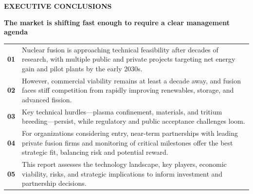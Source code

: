 \documentclass[10pt,a4paper]{article}
\begin{document}
{\textcolor{BOBlue}{\scriptsize\bfseries EXECUTIVE CONCLUSIONS}}\par\vspace{-1pt}
{\Large\sffamily\bfseries\color{BONavy} The market is shifting fast enough to require a clear management agenda}\par\vspace{4pt}
\vspace{2pt}{\color{BOBright}\rule{\linewidth}{1pt}}\vspace{5pt}
\begin{tabularx}{\linewidth}{p{13mm}Y}
\textcolor{BOBlue}{\bfseries 01} & {\small Nuclear fusion is approaching technical feasibility after decades of research, with multiple public and private projects targeting net energy gain and pilot plants by the early 2030s.} \\[6pt]
\textcolor{BOBlue}{\bfseries 02} & {\small However, commercial viability remains at least a decade away, and fusion faces stiff competition from rapidly improving renewables, storage, and advanced fission.} \\[6pt]
\textcolor{BOBlue}{\bfseries 03} & {\small Key technical hurdles—plasma confinement, materials, and tritium breeding—persist, while regulatory and public acceptance challenges loom.} \\[6pt]
\textcolor{BOBlue}{\bfseries 04} & {\small For organizations considering entry, near-term partnerships with leading private fusion firms and monitoring of critical milestones offer the best strategic fit, balancing risk and potential reward.} \\[6pt]
\textcolor{BOBlue}{\bfseries 05} & {\small This report assesses the technology landscape, key players, economic viability, risks, and strategic implications to inform investment and partnership decisions.} \\[6pt]
\end{tabularx}
\clearpage
\end{document}
